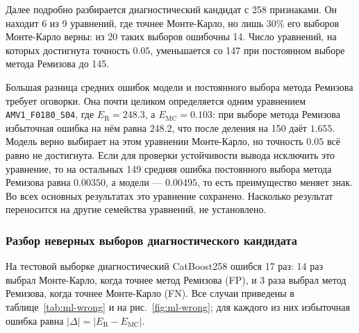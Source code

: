 \documentclass[14pt,a4paper]{extarticle}
\begin{document}
Далее подробно разбирается диагностический кандидат с 258 признаками.
Он находит 6 из 9 уравнений, где точнее Монте-Карло, но лишь 30\%
его выборов Монте-Карло верны: из 20 таких выборов ошибочны 14. Число
уравнений, на которых достигнута точность $0.05$, уменьшается со 147
при постоянном выборе метода Ремизова до 145.

Большая разница средних ошибок модели и постоянного выбора метода
Ремизова требует оговорки. Она почти целиком определяется одним
уравнением \texttt{AMV1\_F0180\_S04}, где $E_{\mathrm{R}}=248.3$,
а $E_{\mathrm{MC}}=0.103$: при выборе метода Ремизова избыточная ошибка
на нём равна $248.2$, что после деления на 150 даёт $1.655$. Модель верно
выбирает на этом уравнении Монте-Карло, но точность $0.05$ всё равно
не достигнута. Если для проверки устойчивости вывода исключить это
уравнение, то на остальных 149 средняя ошибка постоянного выбора метода
Ремизова равна $0.00350$, а модели --- $0.00495$, то есть преимущество
меняет знак. Во всех основных результатах это уравнение сохранено.
Насколько результат переносится на другие семейства уравнений,
не установлено.

\subsubsection{Разбор неверных выборов диагностического кандидата}
На тестовой выборке диагностический CatBoost258 ошибся 17 раз:
14 раз выбрал Монте-Карло, когда точнее метод Ремизова (FP),
и 3 раза выбрал метод Ремизова, когда
точнее Монте-Карло (FN). Все случаи приведены
в таблице~\ref{tab:ml-wrong} и на рис.~\ref{fig:ml-wrong}; для каждого
из них избыточная ошибка равна $|\Delta|=|E_{\mathrm{R}}-E_{\mathrm{MC}}|$.
\end{document}
